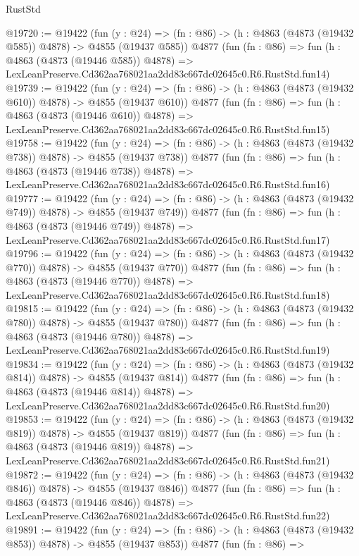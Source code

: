 \begin{lexlean}{RustStd}
\begin{coremodule}
@19720 := @19422
    (fun (y : @24) => (fn : @86) -> (h : @4863 (@4873 (@19432 @585)) @4878) -> @4855 (@19437 @585))
    @4877
    (fun (fn : @86) =>
    fun (h : @4863 (@4873 (@19446 @585)) @4878) =>
    LexLeanPreserve.Cd362aa768021aa2dd83c667dc02645c0.R6.RustStd.fun14)
@19739 := @19422
    (fun (y : @24) => (fn : @86) -> (h : @4863 (@4873 (@19432 @610)) @4878) -> @4855 (@19437 @610))
    @4877
    (fun (fn : @86) =>
    fun (h : @4863 (@4873 (@19446 @610)) @4878) =>
    LexLeanPreserve.Cd362aa768021aa2dd83c667dc02645c0.R6.RustStd.fun15)
@19758 := @19422
    (fun (y : @24) => (fn : @86) -> (h : @4863 (@4873 (@19432 @738)) @4878) -> @4855 (@19437 @738))
    @4877
    (fun (fn : @86) =>
    fun (h : @4863 (@4873 (@19446 @738)) @4878) =>
    LexLeanPreserve.Cd362aa768021aa2dd83c667dc02645c0.R6.RustStd.fun16)
@19777 := @19422
    (fun (y : @24) => (fn : @86) -> (h : @4863 (@4873 (@19432 @749)) @4878) -> @4855 (@19437 @749))
    @4877
    (fun (fn : @86) =>
    fun (h : @4863 (@4873 (@19446 @749)) @4878) =>
    LexLeanPreserve.Cd362aa768021aa2dd83c667dc02645c0.R6.RustStd.fun17)
@19796 := @19422
    (fun (y : @24) => (fn : @86) -> (h : @4863 (@4873 (@19432 @770)) @4878) -> @4855 (@19437 @770))
    @4877
    (fun (fn : @86) =>
    fun (h : @4863 (@4873 (@19446 @770)) @4878) =>
    LexLeanPreserve.Cd362aa768021aa2dd83c667dc02645c0.R6.RustStd.fun18)
@19815 := @19422
    (fun (y : @24) => (fn : @86) -> (h : @4863 (@4873 (@19432 @780)) @4878) -> @4855 (@19437 @780))
    @4877
    (fun (fn : @86) =>
    fun (h : @4863 (@4873 (@19446 @780)) @4878) =>
    LexLeanPreserve.Cd362aa768021aa2dd83c667dc02645c0.R6.RustStd.fun19)
@19834 := @19422
    (fun (y : @24) => (fn : @86) -> (h : @4863 (@4873 (@19432 @814)) @4878) -> @4855 (@19437 @814))
    @4877
    (fun (fn : @86) =>
    fun (h : @4863 (@4873 (@19446 @814)) @4878) =>
    LexLeanPreserve.Cd362aa768021aa2dd83c667dc02645c0.R6.RustStd.fun20)
@19853 := @19422
    (fun (y : @24) => (fn : @86) -> (h : @4863 (@4873 (@19432 @819)) @4878) -> @4855 (@19437 @819))
    @4877
    (fun (fn : @86) =>
    fun (h : @4863 (@4873 (@19446 @819)) @4878) =>
    LexLeanPreserve.Cd362aa768021aa2dd83c667dc02645c0.R6.RustStd.fun21)
@19872 := @19422
    (fun (y : @24) => (fn : @86) -> (h : @4863 (@4873 (@19432 @846)) @4878) -> @4855 (@19437 @846))
    @4877
    (fun (fn : @86) =>
    fun (h : @4863 (@4873 (@19446 @846)) @4878) =>
    LexLeanPreserve.Cd362aa768021aa2dd83c667dc02645c0.R6.RustStd.fun22)
@19891 := @19422
    (fun (y : @24) => (fn : @86) -> (h : @4863 (@4873 (@19432 @853)) @4878) -> @4855 (@19437 @853))
    @4877
    (fun (fn : @86) =>

\end{coremodule}
\end{lexlean}
